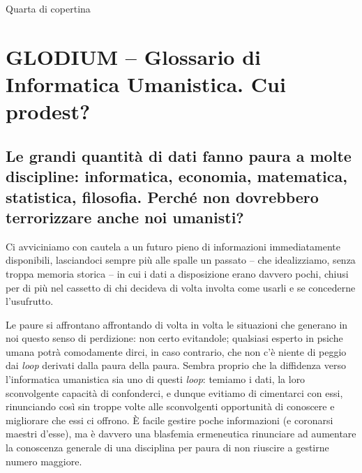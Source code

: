 \documentclass[
  b5paper,
  twoside,
  12pt,
  chapterprefix=false,
  bibliography=totocnumbered,
  parskip=false]{scrbook}
\begin{document}

\thispagestyle{empty}
\vspace{\fill}
Quarta di copertina



{
\setcounter{tocdepth}{0}
\tableofcontents
}

\mainmatter
\hypertarget{glodium-glossario-di-informatica-umanistica.-cui-prodest}{%
\chapter*{GLODIUM -- Glossario di Informatica Umanistica. Cui prodest?}\label{glodium-glossario-di-informatica-umanistica.-cui-prodest}}


\hypertarget{le-grandi-quantita-di-dati-fanno-paura-a-molte-discipline-informatica-economia-matematica-statistica-filosofia.-perche-non-dovrebbero-terrorizzare-anche-noi-umanisti}{%
\section*{Le grandi quantità di dati fanno paura a molte discipline: informatica, economia, matematica, statistica, filosofia. Perché non dovrebbero terrorizzare anche noi umanisti?}\label{le-grandi-quantita-di-dati-fanno-paura-a-molte-discipline-informatica-economia-matematica-statistica-filosofia.-perche-non-dovrebbero-terrorizzare-anche-noi-umanisti}}

Ci avviciniamo con cautela a un futuro pieno di informazioni
immediatamente disponibili, lasciandoci sempre più alle spalle un
passato -- che idealizziamo, senza troppa memoria storica -- in cui i
dati a disposizione erano davvero pochi, chiusi per di più nel cassetto
di chi decideva di volta involta come usarli e se concederne
l'usufrutto.

Le paure si affrontano affrontando di volta in volta le situazioni che
generano in noi questo senso di perdizione: non certo evitandole;
qualsiasi esperto in psiche umana potrà comodamente dirci, in caso
contrario, che non c'è niente di peggio dai \emph{loop} derivati dalla paura
della paura. Sembra proprio che la diffidenza verso l'informatica
umanistica sia uno di questi \emph{loop}: temiamo i dati, la loro
sconvolgente capacità di confonderci, e dunque evitiamo di cimentarci
con essi, rinunciando così sin troppe volte alle sconvolgenti
opportunità di conoscere e migliorare che essi ci offrono. È facile
gestire poche informazioni (e coronarsi maestri d'esse), ma è davvero
una blasfemia ermeneutica rinunciare ad aumentare la conoscenza generale
di una disciplina per paura di non riuscire a gestirne numero maggiore.
\end{document}
